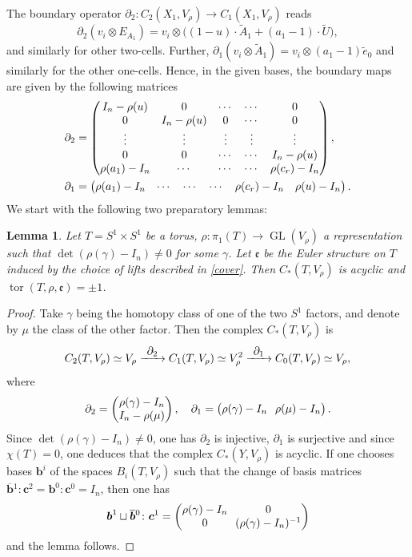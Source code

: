 \documentclass[JEP,XML,SOM,Unicode,NoFloatCountersInSection,published]{cedram}
\newcommand\To[1]{\mathchoice{\xrightarrow{\textstyle\kern4pt#1\kern3pt}}{\stackrel{#1}{\longrightarrow}}{}{}}
\theoremstyle{plain}
\newtheorem{lem}[thm]{Lemma}
\theoremstyle{definition}
\theoremstyle{remark}
\DeclareMathOperator{\GL}{GL}
\numberwithin{equation}{section}
\DeclareMathOperator{\tor}{tor}
\begin{document}
The boundary operator $\partial_2 \colon C_2(X_1, V_\rho) \to C_1(X_1, V_\rho)$ reads
\[
\partial_2(v_i \otimes E_{A_1}) = v_i \otimes \bigl((1-u) \cdot \widetilde A_1 + (a_1 - 1) \cdot \widetilde U\bigr),
\]
and similarly for other two-cells.
Further, $\partial_1(v_i \otimes \widetilde A_1) = v_i \otimes (a_1 - 1) \widetilde e_0$ and similarly for the other one-cells. Hence, in the given bases, the boundary maps are given by the following matrices
\begin{align*}
\arraycolsep4.5pt
\partial_2 &= \begin{pmatrix}
I_n - \rho(u) & 0 & \cdots & \cdots & 0\\
0 & I_n - \rho(u) &0 & \cdots & 0\\
\vdots & \vdots & \vdots & \vdots & \vdots\\
0 & 0 & \cdots & \cdots & I_n - \rho(u)\\
\rho(a_1) - I_n & \cdots & \cdots & \cdots & \rho(c_r)-I_n
\end{pmatrix},\\
\partial_1 &= \begin{pmatrix} \rho(a_1) - I_n & \cdots & \cdots & \cdots & \rho(c_r)-I_n & \rho(u)-I_n \end{pmatrix}.
\end{align*}
We start with the following two preparatory lemmas:
\begin{lem}
\label{lem:bound}
Let $T = S^1\times S^1$ be a torus, $\rho \colon \pi_1(T) \to \GL(V_\rho)$ a representation such that $\det(\rho (\gamma) -I_n) \neq 0$ for some $\gamma$. Let $\mathfrak e$ be the Euler structure on $T$ induced by the choice of lifts described in \cref{cover}. Then $C_*(T, V_\rho)$ is acyclic and $\tor(T, \rho, \mathfrak e) = \pm 1$.
\end{lem}
\begin{proof}
Take $\gamma$ being the homotopy class of one of the two $S^1$ factors, and denote by $\mu$ the class of the other factor. Then the complex $C_*(T,V_\rho)$ is
\[
C_2(T, V_\rho) \simeq V_\rho \To{\partial_2} C_1(T, V_\rho) \simeq V_\rho^2 \To{\partial_1} C_0(T, V_\rho) \simeq V_\rho,
\]
where
\[\arraycolsep3.5pt
\partial_2 = \begin{pmatrix} \rho(\gamma) - I_n\\ I_n - \rho(\mu) \end{pmatrix}, \quad \partial_1 = \begin{pmatrix} \rho(\gamma) - I_n & \rho(\mu)- I_n \end{pmatrix}.
\]
Since $\det (\rho(\gamma)-I_n) \neq 0$, one has $\partial_2$ is injective, $\partial_1$ is surjective and since $\chi(T)=0$, one deduces that the complex $C_*(Y, V_\rho)$ is acyclic. If one chooses bases $\boldsymbol b^i$ of the spaces $B_i(T, V_\rho)$ such that the change of basis matrices $\boldsymbol{\overline b}{}^1 \colon \boldsymbol c^2 = \boldsymbol{ b}^0 \colon \boldsymbol c^0 = I_n$, then one has
\[\arraycolsep3.5pt
\boldsymbol b^1 \sqcup \boldsymbol{\overline b}{}^0 \colon \boldsymbol c^1 = \begin{pmatrix} \rho(\gamma)-I_n & 0 \\ 0 & (\rho(\gamma)-I_n)^{-1} \end{pmatrix}
\]
and the lemma follows.
\end{proof}
\end{document}

